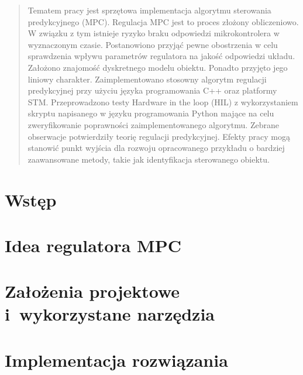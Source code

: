 \documentclass[12pt, twoside, a4paper, openright]{report}
\begin{document}


\cleardoublepage


\cleardoublepage



\cleardoublepage


\begin{abstract}
    Tematem pracy jest sprzętowa implementacja algorytmu sterowania predykcyjnego (MPC).
    Regulacja MPC jest to proces złożony obliczeniowo. W związku z tym istnieje ryzyko
    braku odpowiedzi mikrokontrolera w wyznaczonym czasie. Postanowiono przyjąć pewne
    obostrzenia w celu sprawdzenia wpływu parametrów regulatora na jakość odpowiedzi
    układu. Założono znajomość dyskretnego modelu obiektu. Ponadto przyjęto jego
    liniowy charakter. Zaimplementowano stosowny algorytm regulacji predykcyjnej 
    przy użyciu języka programowania C++ oraz platformy STM. Przeprowadzono testy
    Hardware in the loop (HIL) z wykorzystaniem skryptu napisanego w języku
    programowania Python mające na celu zweryfikowanie poprawności zaimplementowanego
    algorytmu. Zebrane obserwacje potwierdziły teorię regulacji predykcyjnej.
    Efekty pracy mogą stanowić punkt wyjścia dla rozwoju opracowanego przykładu
    o bardziej zaawansowane metody, takie jak identyfikacja sterowanego obiektu.
\end{abstract}
 
\tableofcontents

\newpage
{}

\chapter{Wstęp}


\chapter{Idea regulatora MPC} \label{ch:idea}


\chapter{Założenia projektowe i~wykorzystane narzędzia}


\chapter{Implementacja rozwiązania}

\end{document}
